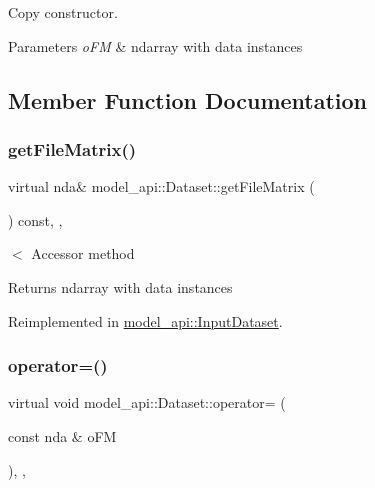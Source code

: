 Copy constructor. 


\begin{DoxyParams}{Parameters}
{\em o\+FM} & ndarray with data instances \\
\hline
\end{DoxyParams}


\subsection{Member Function Documentation}
\mbox{\label{classmodel__api_1_1Dataset_aa2ae7007705796c05e5df64a3d1cda0e}} 
\subsubsection{\texorpdfstring{get\+File\+Matrix()}{getFileMatrix()}}
{\footnotesize\ttfamily virtual nda\& model\+\_\+api\+::\+Dataset\+::get\+File\+Matrix (\begin{DoxyParamCaption}{ }\end{DoxyParamCaption}) const\hspace{0.3cm}{\ttfamily [inline]}, {\ttfamily [protected]}, {\ttfamily [virtual]}}



$<$ Accessor method 

\begin{DoxyReturn}{Returns}
ndarray with data instances 
\end{DoxyReturn}


Reimplemented in \hyperlink{classmodel__api_1_1InputDataset_a853b380f548e21ee7421f887b9be2722}{model\+\_\+api\+::\+Input\+Dataset}.

\mbox{\label{classmodel__api_1_1Dataset_a4000020cf9bc6dd1a55dd40f979f7aea}} 
\subsubsection{\texorpdfstring{operator=()}{operator=()}\hspace{0.1cm}{\footnotesize\ttfamily [1/2]}}
{\footnotesize\ttfamily virtual void model\+\_\+api\+::\+Dataset\+::operator= (\begin{DoxyParamCaption}\item[{const nda \&}]{o\+FM }\end{DoxyParamCaption})\hspace{0.3cm}{\ttfamily [inline]}, {\ttfamily [protected]}, {\ttfamily [virtual]}}


